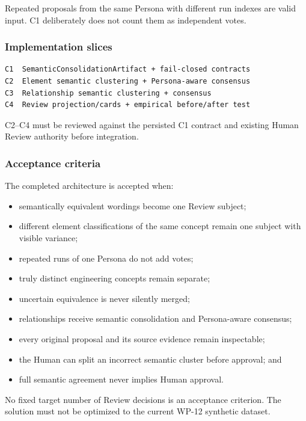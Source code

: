Repeated proposals from the same Persona with different run indexes are valid input. C1 deliberately does not count them as independent votes.

\hypertarget{implementation-slices}{%
\subsubsection{Implementation slices}\label{implementation-slices}}

\begin{verbatim}
C1  SemanticConsolidationArtifact + fail-closed contracts
C2  Element semantic clustering + Persona-aware consensus
C3  Relationship semantic clustering + consensus
C4  Review projection/cards + empirical before/after test
\end{verbatim}

C2--C4 must be reviewed against the persisted C1 contract and existing Human Review authority before integration.

\hypertarget{acceptance-criteria-1}{%
\subsubsection{Acceptance criteria}\label{acceptance-criteria-1}}

The completed architecture is accepted when:

\begin{itemize}
\tightlist
\item
  semantically equivalent wordings become one Review subject;
\item
  different element classifications of the same concept remain one subject with visible variance;
\item
  repeated runs of one Persona do not add votes;
\item
  truly distinct engineering concepts remain separate;
\item
  uncertain equivalence is never silently merged;
\item
  relationships receive semantic consolidation and Persona-aware consensus;
\item
  every original proposal and its source evidence remain inspectable;
\item
  the Human can split an incorrect semantic cluster before approval; and
\item
  full semantic agreement never implies Human approval.
\end{itemize}

No fixed target number of Review decisions is an acceptance criterion. The solution must not be optimized to the current WP-12 synthetic dataset.

